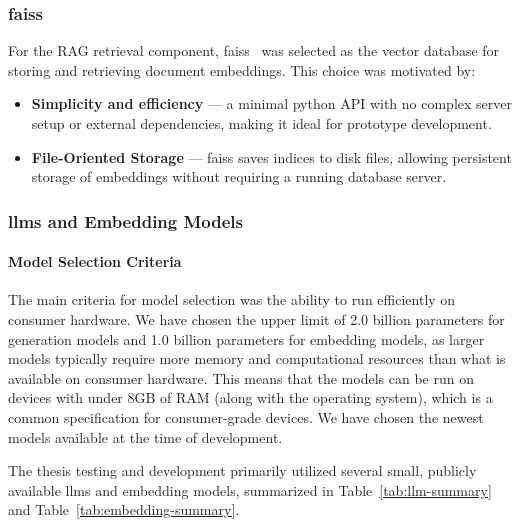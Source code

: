 \subsubsection{\gls{faiss}}

For the RAG retrieval component, \gls{faiss}~\cite{faiss2026} was
selected as the vector database for storing and retrieving document
embeddings. This choice was motivated by:

\begin{itemize}
  \item \textbf{Simplicity and efficiency} --- a minimal python API
    with no complex server setup or external dependencies, making it
    ideal for prototype development.

\item \textbf{File-Oriented Storage} --- \gls{faiss} saves indices
    to disk files, allowing persistent storage of embeddings without
    requiring a running database server.
\end{itemize}

\subsubsection{\glspl{llm} and Embedding Models}

\paragraph{Model Selection Criteria}
The main criteria for model selection was the ability to run efficiently on consumer
hardware. We have chosen the upper limit of 2.0 billion parameters for
generation models and 1.0 billion parameters for embedding models, as larger
models typically require more memory and computational resources than what is
available on consumer hardware. This means that the models can be run on devices
with under 8GB of RAM (along with the operating system), which is a common
specification for consumer-grade devices. We have chosen the newest models
available at the time of development.

The thesis testing and development primarily utilized several small, publicly
available \glspl{llm} and embedding models, summarized in
Table~\ref{tab:llm-summary} and Table~\ref{tab:embedding-summary}.

